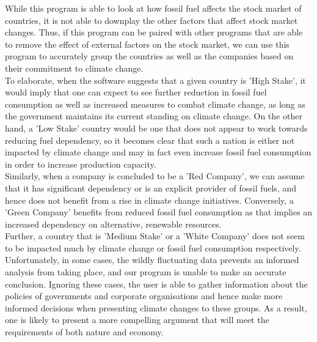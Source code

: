 \documentclass[fontsize=11pt]{article}
\begin{document}
While this program is able to look at how fossil fuel affects the stock
market of countries, it is not able to downplay the other factors that
affect stock market changes. Thus, if this program can be paired with
other programs that are able to remove the effect of external factors on
the stock market, we can use this program to accurately group the
countries as well as the companies based on their commitment to climate
change. \\

To elaborate, when the software suggests that a given country is 'High
Stake', it would imply that one can expect to see further reduction in
fossil fuel consumption as well as increased measures to combat climate
change, as long as the government maintains its current standing on
climate change. On the other hand, a 'Low Stake' country would be one
that does not appear to work towards reducing fuel dependency, so it
becomes clear that such a nation is either not impacted by climate
change and may in fact even increase fossil fuel consumption in order to
increase production capacity. \\

Similarly, when a company is concluded to be a 'Red Company', we can
assume that it has significant dependency or is an explicit provider of
fossil fuels, and hence does not benefit from a rise in climate change
initiatives. Conversely, a 'Green Company' benefits from reduced fossil
fuel consumption as that implies an increased dependency on alternative,
renewable resources. \\

Further, a country that is 'Medium Stake' or a 'White Company' does not
seem to be impacted much by climate change or fossil fuel consumption
respectively. \\

Unfortunately, in some cases, the wildly fluctuating data prevents an
informed analysis from taking place, and our program is unable to make
an accurate conclusion. Ignoring these cases, the user is able to gather
information about the policies of governments and corporate
organisations and hence make more informed decisions when presenting
climate changes to these groups. As a result, one is likely to present a
more compelling argument that will meet the requirements of both nature
and economy. \\
\end{document}
